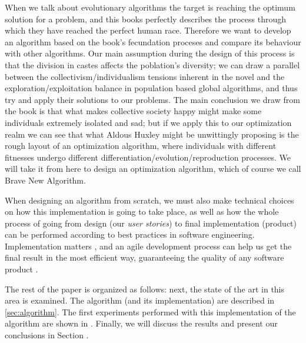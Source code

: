 When we talk about evolutionary algorithms the target is reaching the
optimum solution for a problem, and this books perfectly describes
the process through which they have reached the perfect human
race. Therefore we want to develop an algorithm based on the book's
fecundation proceses and compare its behaviour with other
algorithms. Our main assumption during the design of this process is
that the division in castes affects the
poblation's diversity; we can draw a parallel between the
collectivism/individualism tensions inherent in the novel and the
exploration/exploitation balance in population based global
algorithms, and thus try and apply their solutions to our
problems. The main conclusion we draw from the book is that what makes
collective society happy might make some individuals extremely
isolated and sad; but if we apply this to our optimization realm we
can see that what Aldous Huxley might be unwittingly proposing is the
rough layout of an optimization algorithm, where individuals with 
different fitnesses undergo different
differentiation/evolution/reproduction processes. We will take it from
here to design an optimization algorithm, which of course we call Brave
New Algorithm.

When designing an algorithm from scratch, we must also make technical
choices on how this implementation is going to take place, as well as
how the whole process of going from design (our {\em user stories}) to
final implementation (product) can be performed according to best
practices in software engineering. Implementation matters
\cite{merelo2011implementation}, and an agile development process can
help us get the final result in the most efficient way, guaranteeing
the quality of any software product \cite{DBLP:journals/corr/abs-2104-12545}.

The rest of the paper is organized as follows: next, the state of the
art in this area is examined. The algorithm (and its implementation)
are described in \ref{sec:algorithm}. The first experiments performed
with this implementation of the algorithm are shown in
\cite{sec:experiments}. Finally, we will discuss the results and
present our conclusions in Section \cite{sec:conc}.